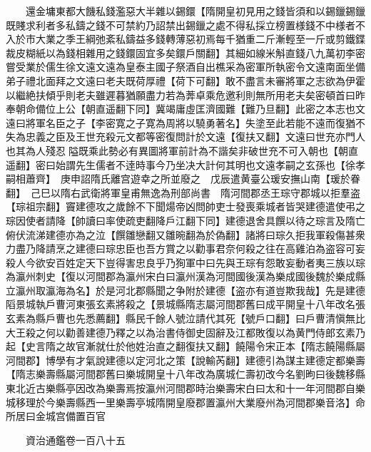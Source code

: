 　　還金墉東都大饑私錢濫惡大半雜以錫鐶【隋開皇初見用之錢皆須和以錫鑞錫鑞既賤求利者多私鑄之錢不可禁約乃詔禁出錫鑞之處不得私採立榜置様錢不中様者不入於市大業之季王綱弛紊私鑄益多錢轉薄惡初焉每千猶重二斤漸輕至一斤或剪鐵鍱裁皮糊紙以為錢相雜用之錢鐶固宜多矣鐶戶關翻】其細如線米斛直錢八九萬初李密嘗受業於儒生徐文遠文遠為皇泰主國子祭酒自出樵采為密軍所執密令文遠南面坐備弟子禮北面拜之文遠曰老夫既荷厚禮【荷下可翻】敢不盡言未審將軍之志欲為伊霍以繼絶扶傾乎則老夫雖遲暮猶願盡力若為莾卓乘危邀利則無所用老夫矣密頓首曰昨奉朝命備位上公【朝直遥翻下同】冀竭庸虛匡濟國難【難乃旦翻】此密之本志也文遠曰將軍名臣之子【李密寛之子寛為周將以驍勇著名】失塗至此若能不遠而復猶不失為忠義之臣及王世充殺元文都等密復問計於文遠【復扶又翻】文遠曰世充亦門人也其為人殘忍隘既乘此勢必有異圖將軍前計為不諧矣非破世充不可入朝也【朝直遥翻】密曰始謂先生儒者不逹時事今乃坐决大計何其明也文遠孝嗣之玄孫也【徐孝嗣相蕭齊】　庚申詔隋氏離宫遊幸之所並廢之　戊辰遣黄臺公瑗安撫山南【瑗於眷翻】　己巳以隋右武衛將軍皇甫無逸為刑部尚書　隋河間郡丞王琮守郡城以拒羣盗【琮祖宗翻】竇建德攻之歲餘不下聞煬帝凶問帥吏士發喪乘城者皆哭建德遣使弔之琮因使者請降【帥讀曰率使疏吏翻降戶江翻下同】建德退舍具饌以待之琮言及隋亡俯伏流涕建德亦為之泣【饌雛戀翻又雛晼翻為於偽翻】諸將曰琮久拒我軍殺傷甚衆力盡乃降請烹之建德曰琮忠臣也吾方賞之以勸事君奈何殺之往在高雞泊為盗容可妄殺人今欲安百姓定天下豈得害忠良乎乃狥軍中曰先與王琮有怨敢妄動者夷三族以琮為瀛州刺史【復以河間郡為瀛州宋白曰瀛州漢為河間國後漢為樂成國後魏於樂成縣立瀛州取瀛海為名】於是河北郡縣聞之争附於建德【盗亦有道豈欺我哉】先是建德䧟景城執戶曹河東張玄素將殺之【景城縣隋志屬河間郡舊曰成平開皇十八年改名張玄素為縣戶曹也先悉薦翻】縣民千餘人號泣請代其死【號戶口翻】曰戶曹清愼無比大王殺之何以勸善建德乃釋之以為治書侍御史固辭及江都敗復以為黄門侍郎玄素乃起【史言隋之故官漸就仕於他姓治直之翻復扶又翻】饒陽令宋正本【隋志饒陽縣屬河間郡】博學有才氣說建德以定河北之策【說輸芮翻】建德引為謀主建德定都樂壽【隋志樂壽縣屬河間郡舊曰樂城開皇十八年改為廣城仁壽初改今名劉昫曰後魏移縣東北近古樂縣亭因改為樂壽焉按瀛州河間郡時治樂壽宋白曰太和十一年河間郡自樂城移理於今樂壽縣西一里樂壽亭城隋開皇廢郡置瀛州大業廢州為河間郡樂音洛】命所居曰金城宫備置百官

　　資治通鑑卷一百八十五


    


 


 



 

 
  








